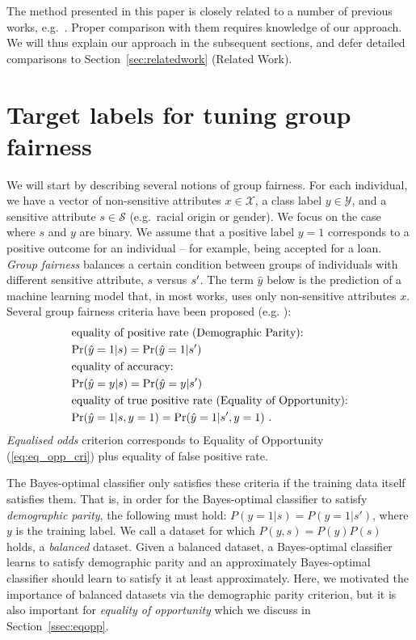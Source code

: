 The method presented in this paper is closely related to a number of previous works,
e.g.\ \citet{kamiran2012data,calders2010three}.
Proper comparison with them requires knowledge of our approach.
We will thus explain our approach in the subsequent sections, and defer detailed comparisons to Section~\ref{sec:relatedwork} (Related Work).

\section{Target labels for tuning group fairness}
We will start by describing several notions of group fairness.
For each individual, we have a vector of non-sensitive attributes $x\in\mathcal{X}$, a class label $y\in\mathcal{Y}$, and a sensitive attribute $s\in\mathcal{S}$ (e.g.\ racial origin or gender).
%
We focus on the case where $s$ and $y$ are binary. 
%
We assume that a positive label $y=1$ corresponds to a positive outcome for an individual -- for example, being accepted for a loan.
%
%
\emph{Group fairness} balances a certain condition between groups of individuals with different sensitive attribute, $s$ versus $s\sp{\prime}$. 
%
The term $\hat{y}$ below is the prediction of a machine learning model that,
in most works, uses only non-sensitive attributes $x$.
%
Several group fairness criteria have been proposed (e.g. \citet{zafar2017fairnesstreatment,chouldechova2017fair,hardt2016equality}):
\begin{align}
& \text{equality of positive rate (Demographic Parity):}\nonumber\\
& \text{Pr}(\hat{y}=1|s)=\text{Pr}(\hat{y}=1|s\sp{\prime}) \label{eq:eq_dem_par}\\
& \text{equality of accuracy:}\nonumber\\
& \text{Pr}(\hat{y}=y|s)=\text{Pr}(\hat{y}=y|s\sp{\prime}) \\
& \text{equality of true positive rate (Equality of Opportunity):} \nonumber\\
& \text{Pr}(\hat{y}=1|s,y=1)=\text{Pr}(\hat{y}=1|s\sp{\prime},y=1)  \label{eq:eq_opp_cri}~.
\end{align}
\emph{Equalised odds} criterion corresponds to Equality of Opportunity (\ref{eq:eq_opp_cri}) plus equality of false positive rate.

The Bayes-optimal classifier only satisfies these criteria if the training data itself satisfies them.
That is, in order for the Bayes-optimal classifier to satisfy \emph{demographic parity}, the following must hold:
$P(y=1|s) = P(y=1|s\prime)$, where $y$ is the training label.
We call a dataset for which $P(y, s)=P(y)P(s)$ holds, a \emph{balanced} dataset.
Given a balanced dataset, a Bayes-optimal classifier learns to satisfy demographic parity
and an approximately Bayes-optimal classifier should learn to satisfy it at least approximately.
Here, we motivated the importance of balanced datasets via the demographic parity criterion,
but it is also important for \emph{equality of opportunity} which we discuss in Section~\ref{ssec:eqopp}.

